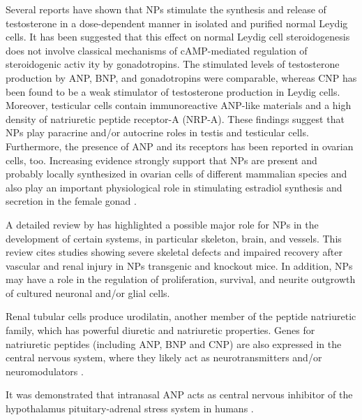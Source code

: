 \documentclass[14pt,a4paper,onecolumn]{extarticle}
\begin{document}
Several reports have shown that NPs stimulate the synthesis and release of testosterone in a dose-dependent manner in isolated and purified normal Leydig cells. It has been suggested that this effect on normal Leydig cell steroidogenesis does not involve classical mechanisms of cAMP-mediated regulation of steroidogenic activ ity by gonadotropins. The stimulated levels of testosterone production by ANP, BNP, and gonadotropins were comparable, whereas CNP has been found to be a weak stimulator of testosterone production in Leydig cells. Moreover, testicular cells contain immunoreactive ANP-like materials and a high density of natriuretic peptide receptor-A (NRP-A). These findings suggest that NPs play paracrine and/or autocrine roles in testis and testicular cells. Furthermore, the presence of ANP and its receptors has been reported in ovarian cells, too. Increasing evidence strongly support that NPs are present and probably locally synthesized in ovarian cells of different mammalian species and also play an important physiological role in stimulating estradiol synthesis and secretion in the female gonad \citep{112}. %

A detailed review by \citep{107} has highlighted a possible major role for NPs in the development of certain systems, in particular skeleton, brain, and vessels. This review cites  studies showing severe skeletal defects and impaired recovery after vascular and renal injury in NPs transgenic and knockout mice. In addition, NPs may have a role in the regulation of proliferation, survival, and neurite outgrowth of cultured neuronal and/or glial cells.


Renal tubular cells produce urodilatin, another member of the peptide natriuretic family, which has powerful diuretic and natriuretic properties.  Genes for natriuretic peptides (including ANP, BNP and CNP) are also expressed in the central nervous system, where they likely act as neurotransmitters and/or neuromodulators \citep{100}.

It was demonstrated that intranasal ANP acts as central nervous inhibitor of the hypothalamus pituitary-adrenal stress system in humans \citep{103}.
\end{document}
